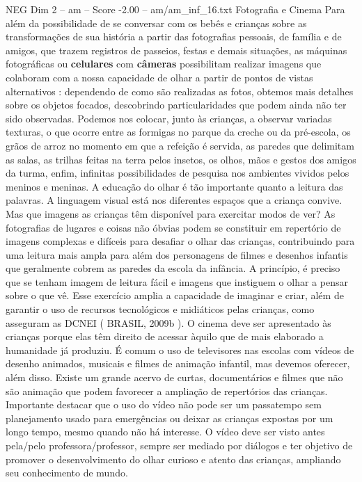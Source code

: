 \begin{textsample}{NEG Dim 2 – am – Score -2.00 – am/am\_inf\_16.txt}  \label{ex:f2_neg_133}
Fotografia e Cinema Para além da possibilidade de se conversar com os bebês e crianças sobre as transformações de sua história a partir das fotografias pessoais, de família e de amigos, que trazem registros de passeios, festas e demais situações, as máquinas fotográficas ou \textbf{celulares} com \textbf{câmeras} possibilitam realizar imagens que colaboram com a nossa capacidade de olhar a partir de pontos de vistas alternativos : dependendo de como são realizadas as fotos, obtemos mais detalhes sobre os objetos focados, descobrindo particularidades que podem ainda não ter sido observadas.
Podemos nos colocar, junto às crianças, a observar variadas texturas, o que ocorre entre as formigas no parque da creche ou da pré-escola, os grãos de arroz no momento em que a refeição é servida, as paredes que delimitam as salas, as trilhas feitas na terra pelos insetos, os olhos, mãos e gestos dos amigos da turma, enfim, infinitas possibilidades de pesquisa nos ambientes vividos pelos meninos e meninas.
A educação do olhar é tão importante quanto a leitura das palavras.
A linguagem visual está nos diferentes espaços que a criança convive.
Mas que imagens as crianças têm disponível para exercitar modos de ver?
As fotografias de lugares e coisas não óbvias podem se constituir em repertório de imagens complexas e difíceis para desafiar o olhar das crianças, contribuindo para uma leitura mais ampla para além dos personagens de filmes e desenhos infantis que geralmente cobrem as paredes da escola da infância.
A princípio, é preciso que se tenham imagem de leitura fácil e imagens que instiguem o olhar a pensar sobre o que vê.
Esse exercício amplia a capacidade de imaginar e criar, além de garantir o uso de recursos tecnológicos e midiáticos pelas crianças, como asseguram as DCNEI ( BRASIL, 2009b ).
O cinema deve ser apresentado às crianças porque elas têm direito de acessar àquilo que de mais elaborado a humanidade já produziu.
É comum o uso de televisores nas escolas com vídeos de desenho animados, musicais e filmes de animação infantil, mas devemos oferecer, além disso.
Existe um grande acervo de curtas, documentários e filmes que não são animação que podem favorecer a ampliação de repertórios das crianças.
Importante destacar que o uso do vídeo não pode ser um passatempo sem planejamento usado para emergências ou deixar as crianças expostas por um longo tempo, mesmo quando não há interesse.
O vídeo deve ser visto antes pela/pelo professora/professor, sempre ser mediado por diálogos e ter objetivo de promover o desenvolvimento do olhar curioso e atento das crianças, ampliando seu conhecimento de mundo.

\end{textsample}
